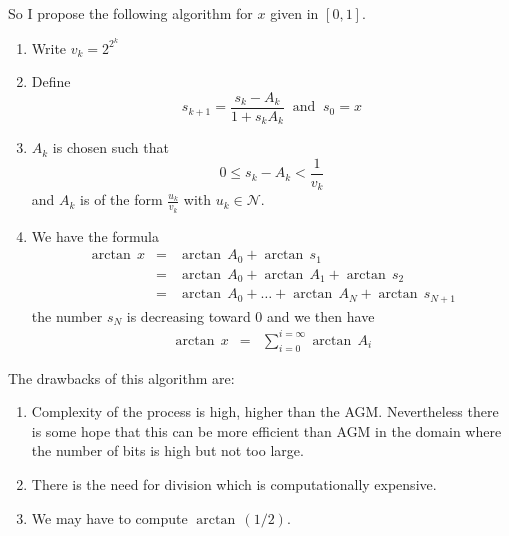 \documentclass[12pt]{amsart}
\def\N{{\mathcal N}}
\begin{document}
So I propose the following algorithm for $x$ given in $[0,1]$.
\begin{enumerate}
\item Write $v_k=2^{2^k}$
\item Define
\begin{equation*}
s_{k+1}=\frac{s_k-A_k}{1+s_kA_k}\;\;\mbox{and}\;\;s_0=x
\end{equation*}
\item $A_k$ is chosen such that
\begin{equation*}
0\leq s_k-A_k<\frac{1}{v_k}
\end{equation*}
and $A_k$ is of the form $\frac{u_k}{v_k}$ with $u_k\in\N$.
\item We have the formula
\begin{equation*}
\begin{array}{rcl}
\arctan\,x
&=&\arctan\,A_0+\arctan\,s_1\\
&=&\arctan\,A_0+\arctan\,A_1+\arctan\,s_2\\
&=&\arctan\,A_0+\dots+\arctan\,A_N+\arctan\,s_{N+1}
\end{array}
\end{equation*}
the number $s_N$ is decreasing toward $0$ and we then have
\begin{equation*}
\begin{array}{rcl}
\arctan\,x&=&\sum_{i=0}^{i=\infty}\arctan\,A_i
\end{array}
\end{equation*}

\end{enumerate}
The drawbacks of this algorithm are:
\begin{enumerate}
\item Complexity of the process is high, higher than the AGM. Nevertheless there is some hope that this can be more efficient than AGM in the domain where the number of bits is high but not too large.
\item There is the need for division which is computationally expensive.
\item We may have to compute $\arctan\,(1/2)$.
\end{enumerate}
\end{document}
